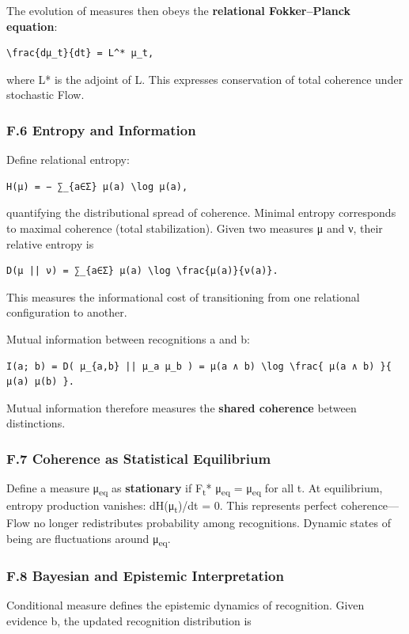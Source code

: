 \documentclass[11pt]{article}
\begin{document}
The evolution of measures then obeys the \textbf{relational Fokker–Planck equation}:

\begin{verbatim}
\frac{dμ_t}{dt} = L^* μ_t,
\end{verbatim}

where L* is the adjoint of L.  
This expresses conservation of total coherence under stochastic Flow.
\subsubsection*{F.6 Entropy and Information}
\label{sec:orga6edbc1}
Define relational entropy:

\begin{verbatim}
H(μ) = − ∑_{a∈Σ} μ(a) \log μ(a),
\end{verbatim}

quantifying the distributional spread of coherence.  
Minimal entropy corresponds to maximal coherence (total stabilization).  
Given two measures μ and ν, their relative entropy is

\begin{verbatim}
D(μ || ν) = ∑_{a∈Σ} μ(a) \log \frac{μ(a)}{ν(a)}.
\end{verbatim}

This measures the informational cost of transitioning  
from one relational configuration to another.

Mutual information between recognitions a and b:

\begin{verbatim}
I(a; b) = D( μ_{a,b} || μ_a μ_b ) = μ(a ∧ b) \log \frac{ μ(a ∧ b) }{ μ(a) μ(b) }.
\end{verbatim}

Mutual information therefore measures the \textbf{shared coherence} between distinctions.
\subsubsection*{F.7 Coherence as Statistical Equilibrium}
\label{sec:orge711e02}
Define a measure μ\textsubscript{eq} as \textbf{stationary} if  
F\textsubscript{t}* μ\textsubscript{eq} = μ\textsubscript{eq} for all t.  
At equilibrium, entropy production vanishes: dH(μ\textsubscript{t})/dt = 0.  
This represents perfect coherence—  
Flow no longer redistributes probability among recognitions.  
Dynamic states of being are fluctuations around μ\textsubscript{eq}.
\subsubsection*{F.8 Bayesian and Epistemic Interpretation}
\label{sec:orgcc16cda}
Conditional measure defines the epistemic dynamics of recognition.  
Given evidence b, the updated recognition distribution is
\end{document}
